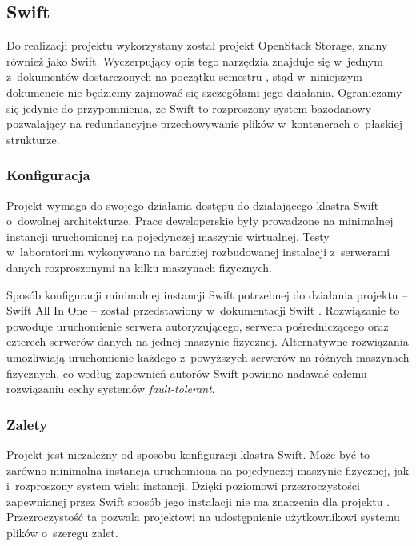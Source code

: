 \subsection{Swift}

Do realizacji projektu \cb{} wykorzystany został projekt OpenStack Storage, znany
również jako Swift. Wyczerpujący opis tego narzędzia znajduje się w~jednym
z~dokumentów dostarczonych na początku semestru \cite{qba-swift}, stąd
w~niniejszym dokumencie nie będziemy zajmować się szczegółami jego działania.
Ograniczamy się jedynie do przypomnienia, że Swift to rozproszony system
bazodanowy pozwalający na redundancyjne przechowywanie plików w~kontenerach
o~płaskiej strukturze.

\subsubsection{Konfiguracja}

Projekt \cb{} wymaga do swojego działania dostępu do działającego klastra Swift
o~dowolnej architekturze. Prace deweloperskie były prowadzone na minimalnej
instancji uruchomionej na pojedynczej maszynie wirtualnej. Testy w~laboratorium
wykonywano na bardziej rozbudowanej instalacji z~serwerami danych rozproszonymi
na kilku maszynach fizycznych.

Sposób konfiguracji minimalnej instancji Swift potrzebnej do działania projektu
\cb{} -- Swift All In One -- został przedstawiony w~dokumentacji Swift
\cite{swift_doc}. Rozwiązanie to powoduje uruchomienie serwera autoryzującego,
serwera pośredniczącego oraz czterech serwerów danych na jednej maszynie
fizycznej. Alternatywne rozwiązania umożliwiają uruchomienie każdego
z~powyższych serwerów na różnych maszynach fizycznych, co według zapewnień
autorów Swift powinno nadawać całemu rozwiązaniu cechy systemów
\textit{fault-tolerant}.

\subsubsection{Zalety}

Projekt \cb{} jest niezależny od sposobu konfiguracji klastra Swift. Może być to
zarówno minimalna instancja uruchomiona na pojedynczej maszynie fizycznej, jak
i~rozproszony system wielu instancji. Dzięki poziomowi przezroczystości
zapewnianej przez Swift sposób jego instalacji nie ma znaczenia dla projektu
\cb{}. Przezroczystość ta pozwala projektowi \cb{} na udostępnienie
użytkownikowi systemu plików o~szeregu zalet.

